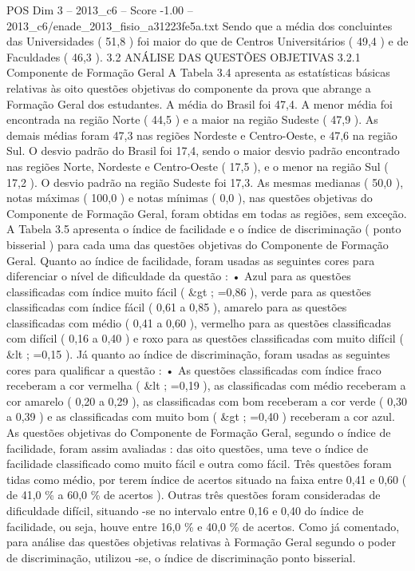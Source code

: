 \begin{textsample}{POS Dim 3 – 2013\_c6 – Score -1.00 – 2013\_c6/enade\_2013\_fisio\_a31223fe5a.txt}
Sendo que a média dos concluintes das Universidades ( 51,8 ) foi maior do que de Centros Universitários ( 49,4 ) e de Faculdades ( 46,3 ). 3.2 ANÁLISE DAS QUESTÕES OBJETIVAS 3.2.1 Componente de Formação Geral A Tabela 3.4 apresenta as estatísticas básicas relativas às oito questões objetivas do componente da prova que abrange a Formação Geral dos estudantes.
A média do Brasil foi 47,4.
A menor média foi encontrada na região Norte ( 44,5 ) e a maior na região Sudeste ( 47,9 ).
As demais médias foram 47,3 nas regiões Nordeste e Centro-Oeste, e 47,6 na região Sul.
O desvio padrão do Brasil foi 17,4, sendo o maior desvio padrão encontrado nas regiões Norte, Nordeste e Centro-Oeste ( 17,5 ), e o menor na região Sul ( 17,2 ).
O desvio padrão na região Sudeste foi 17,3.
As mesmas medianas ( 50,0 ), notas máximas ( 100,0 ) e notas mínimas ( 0,0 ), nas questões objetivas do Componente de Formação Geral, foram obtidas em todas as regiões, sem exceção.
A Tabela 3.5 apresenta o índice de facilidade e o índice de discriminação ( ponto bisserial ) para cada uma das questões objetivas do Componente de Formação Geral.
Quanto ao índice de facilidade, foram usadas as seguintes cores para diferenciar o nível de dificuldade da questão : • Azul para as questões classificadas com índice muito fácil ( \&gt ; =0,86 ), verde para as questões classificadas com índice fácil ( 0,61 a 0,85 ), amarelo para as questões classificadas com médio ( 0,41 a 0,60 ), vermelho para as questões classificadas com difícil ( 0,16 a 0,40 ) e roxo para as questões classificadas com muito difícil ( \&lt ; =0,15 ).
Já quanto ao índice de discriminação, foram usadas as seguintes cores para qualificar a questão : • As questões classificadas com índice fraco receberam a cor vermelha ( \&lt ; =0,19 ), as classificadas com médio receberam a cor amarelo ( 0,20 a 0,29 ), as classificadas com bom receberam a cor verde ( 0,30 a 0,39 ) e as classificadas com muito bom ( \&gt ; =0,40 ) receberam a cor azul.
As questões objetivas do Componente de Formação Geral, segundo o índice de facilidade, foram assim avaliadas : das oito questões, uma teve o índice de facilidade classificado como muito fácil e outra como fácil.
Três questões foram tidas como médio, por terem índice de acertos situado na faixa entre 0,41 e 0,60 ( de 41,0 \% a 60,0 \% de acertos ).
Outras três questões foram consideradas de dificuldade difícil, situando -se no intervalo entre 0,16 e 0,40 do índice de facilidade, ou seja, houve entre 16,0 \% e 40,0 \% de acertos.
Como já comentado, para análise das questões objetivas relativas à Formação Geral segundo o poder de discriminação, utilizou -se, o índice de discriminação ponto bisserial.

\end{textsample}
